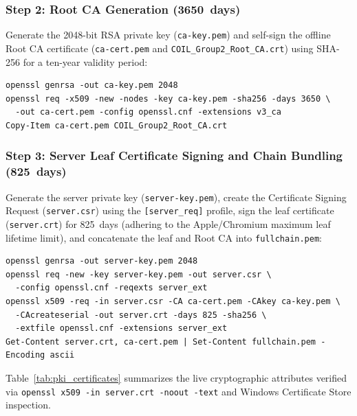 \subsubsection{Step 2: Root CA Generation (\qty{3650}{days})}
Generate the 2048-bit RSA private key (\texttt{ca-key.pem}) and self-sign the offline Root CA certificate (\texttt{ca-cert.pem} and \texttt{COIL\_Group2\_Root\_CA.crt}) using SHA-256 for a ten-year validity period:

\begin{lstlisting}[caption={Generating the private 2048-bit RSA Root Certificate Authority.},label={lst:manual3_rootca}]
openssl genrsa -out ca-key.pem 2048
openssl req -x509 -new -nodes -key ca-key.pem -sha256 -days 3650 \
  -out ca-cert.pem -config openssl.cnf -extensions v3_ca
Copy-Item ca-cert.pem COIL_Group2_Root_CA.crt
\end{lstlisting}

\subsubsection{Step 3: Server Leaf Certificate Signing and Chain Bundling (\qty{825}{days})}
Generate the server private key (\texttt{server-key.pem}), create the Certificate Signing Request (\texttt{server.csr}) using the \texttt{[server\_req]} profile, sign the leaf certificate (\texttt{server.crt}) for \qty{825}{days} (adhering to the Apple/Chromium maximum leaf lifetime limit), and concatenate the leaf and Root CA into \texttt{fullchain.pem}:

\begin{lstlisting}[caption={Signing the SAN leaf certificate and building \texttt{fullchain.pem}.},label={lst:manual3_leaf}]
openssl genrsa -out server-key.pem 2048
openssl req -new -key server-key.pem -out server.csr \
  -config openssl.cnf -reqexts server_ext
openssl x509 -req -in server.csr -CA ca-cert.pem -CAkey ca-key.pem \
  -CAcreateserial -out server.crt -days 825 -sha256 \
  -extfile openssl.cnf -extensions server_ext
Get-Content server.crt, ca-cert.pem | Set-Content fullchain.pem -Encoding ascii
\end{lstlisting}

Table~\ref{tab:pki_certificates} summarizes the live cryptographic attributes verified via \texttt{openssl x509 -in server.crt -noout -text} and Windows Certificate Store inspection.

